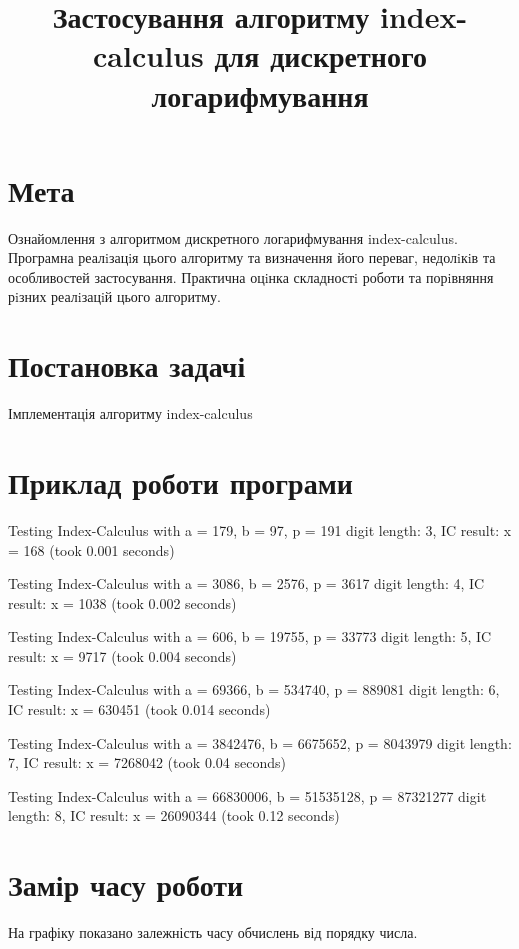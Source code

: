 \documentclass{article}
\title{Застосування алгоритму index-calculus для дискретного логарифмування}
\date{}
\begin{document}
\maketitle

\section{Мета}
\quad Ознайомлення з алгоритмом дискретного логарифмування index-calculus. Програмна реалiзацiя
цього алгоритму та визначення його переваг, недолiкiв та особливостей застосування. Практична оцiнка
складностi роботи та порiвняння рiзних реалiзацiй цього алгоритму.

\section{Постановка задачі}
\quad Імплементація алгоритму index-calculus

\section{Приклад роботи програми}
\quad 
Testing Index-Calculus with a = 179, b = 97, p = 191 digit length: 3, IC result: x = 168 (took 0.001 seconds)

Testing Index-Calculus with a = 3086, b = 2576, p = 3617 digit length: 4, IC result: x = 1038 (took 0.002 seconds)

Testing Index-Calculus with a = 606, b = 19755, p = 33773 digit length: 5, IC result: x = 9717 (took 0.004 seconds)

Testing Index-Calculus with a = 69366, b = 534740, p = 889081 digit length: 6, IC result: x = 630451 (took 0.014 seconds)

Testing Index-Calculus with a = 3842476, b = 6675652, p = 8043979 digit length: 7, IC result: x = 7268042 (took 0.04 seconds)

Testing Index-Calculus with a = 66830006, b = 51535128, p = 87321277 digit length: 8, IC result: x = 26090344 (took 0.12 seconds)

\section{Замір часу роботи}
\quad На графіку показано залежність часу обчислень від порядку числа.
\end{document}

